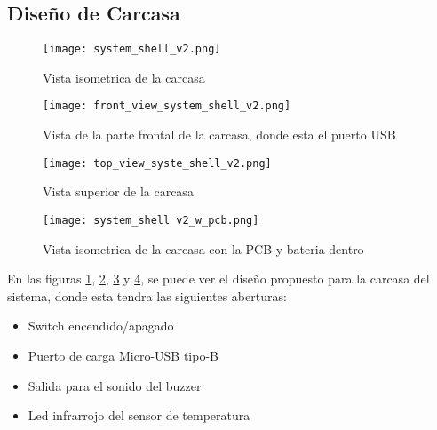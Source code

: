     \subsection{Diseño de Carcasa}
        \begin{figure}[htp!]
            \centering
                \texttt{[image: system\_shell\_v2.png]}
                \caption{Vista isometrica de la carcasa}
                \label{fig: isometric_view_shell}
        \end{figure}
        \FloatBarrier

        \begin{figure}[htp!]
            \centering
                \texttt{[image: front\_view\_system\_shell\_v2.png]}
                \caption{Vista de la parte frontal de la carcasa, donde esta el puerto USB}
                \label{fig: front_view_shell}
        \end{figure}
        \FloatBarrier

        \begin{figure}[htp!]
            \centering
                \texttt{[image: top\_view\_syste\_shell\_v2.png]}
                \caption{Vista superior de la carcasa}
                \label{fig: top_view_shell}
        \end{figure}
        \FloatBarrier

        \begin{figure}[htp!]
            \centering
                \texttt{[image: system\_shell v2\_w\_pcb.png]}
                \caption{Vista isometrica de la carcasa con la PCB y bateria dentro}
                \label{isometric_view_pcb_shell}
        \end{figure}
        \FloatBarrier

        En las figuras \ref{fig: isometric_view_shell}, \ref{fig: front_view_shell},
        \ref{fig: top_view_shell} y \ref{isometric_view_pcb_shell}, se puede ver el diseño propuesto
        para la carcasa del sistema, donde esta tendra las siguientes aberturas:

        \begin{itemize}
            \item Switch encendido/apagado
            \item Puerto de carga Micro-USB tipo-B
            \item Salida para el sonido del buzzer
            \item Led infrarrojo del sensor de temperatura
        \end{itemize}

